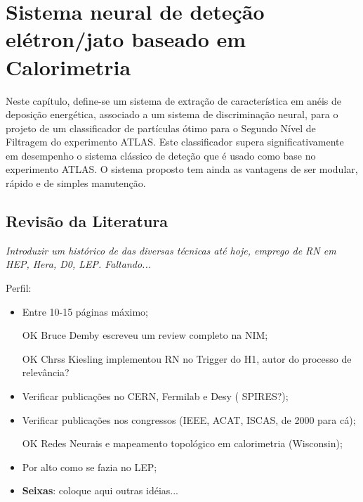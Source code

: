 \typeout{ ====================================================================}
\typeout{ ====================================================================}

\chapter{Sistema neural de deteção elétron/jato baseado em Calorimetria}
\label{chap:neural}

Neste capítulo, define-se um sistema de extração de característica em anéis de
deposição energética, associado a um sistema de discriminação neural, para o
projeto de um classificador de partículas ótimo para o Segundo Nível de
Filtragem do experimento ATLAS. Este classificador supera significativamente
em desempenho o sistema clássico de deteção que é usado como base no
experimento ATLAS. O sistema proposto tem ainda as vantagens de ser modular,
rápido e de simples manutenção.

\section{Revisão da Literatura}

\textit{Introduzir um histórico de das diversas técnicas até hoje, emprego de
RN em HEP, Hera, D0, LEP. Faltando...}

Perfil:

\begin{itemize}
\item Entre 10-15 páginas máximo;
\item[OK] Bruce Demby escreveu um review completo na NIM;
\item[OK] Chrss Kiesling implementou RN no Trigger do H1, autor do processo de
relevância? 
\item Verificar publicações no CERN, Fermilab e Desy ( SPIRES?);
\item Verificar publicações nos congressos (IEEE, ACAT, ISCAS, de 2000 para
cá); 
\item[OK] Redes Neurais e mapeamento topológico em calorimetria (Wisconsin);
\item Por alto como se fazia no LEP;
\item \textbf{Seixas}: coloque aqui outras idéias...
\end{itemize}

